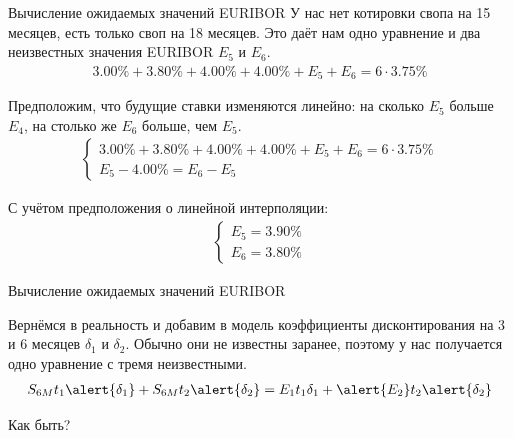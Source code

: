 \documentclass{beamer}
\begin{document}
\begin{frame}{Вычисление ожидаемых значений EURIBOR}
\justify
У нас нет котировки свопа на 15 месяцев, есть только своп на 18 месяцев. Это даёт нам одно уравнение и два неизвестных значения EURIBOR $E_5$ и $E_6$.
\begin{align*}
3.00\%+3.80\%+4.00\%+4.00\%+E_5+E_6 = 6\cdot3.75\%
\end{align*}

\justify
Предположим, что будущие ставки изменяются линейно: на сколько $E_5$ больше $E_4$, на столько же $E_6$ больше, чем $E_5$.
\begin{align*}
\begin{cases}
3.00\%+3.80\%+4.00\%+4.00\%+E_5+E_6 = 6\cdot3.75\% \\
E_5 - 4.00\% = E_6 - E_5
\end{cases}
\end{align*}

С учётом предположения о линейной интерполяции:
\begin{align*}
\begin{cases}
E_5 = 3.90\% \\
E_6 = 3.80\%
\end{cases}
\end{align*}
\end{frame}



\begin{frame}{Вычисление ожидаемых значений EURIBOR}
\centering
{}

\justify
Вернёмся в реальность и добавим в модель коэффициенты дисконтирования на 3 и 6 месяцев $\delta_1$ и $\delta_2$. Обычно они не известны заранее, поэтому у нас получается одно уравнение с тремя неизвестными.
\begin{align*}
S_{6M}t_1\alert{\delta_1} + S_{6M}t_2\alert{\delta_2} = E_1t_1\delta_1 + \alert{E_2}t_2\alert{\delta_2}
\end{align*}

\justify
Как быть?
\end{frame}
\end{document}
